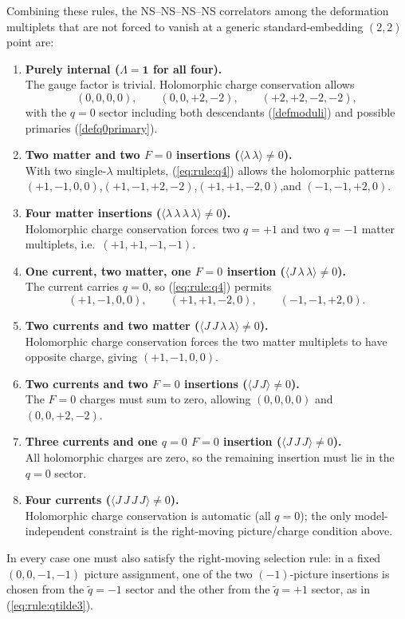 \documentclass[12pt]{article}
\newcommand{\wt}[1]{\widetilde{#1}}
\begin{document}
	Combining these rules, the NS--NS--NS--NS correlators among the deformation multiplets that are not forced to vanish at a generic standard-embedding $(2,2)$ point are:
	\begin{enumerate}
	\item {\bf Purely internal ($\Lambda=\mathbf{1}$ for all four).}\\
	The gauge factor is trivial. Holomorphic charge conservation allows
	\[
	(0,0,0,0),\qquad (0,0,+2,-2),\qquad (+2,+2,-2,-2),
	\]
	with the $q=0$ sector including both descendants (\ref{defmoduli}) and possible primaries (\ref{defq0primary}).
	
	\item {\bf Two matter and two $F=0$ insertions ($\langle\lambda\,\lambda\rangle\neq 0$).}\\
	With two single-$\lambda$ multiplets, (\ref{eq:rule:q4}) allows the holomorphic patterns $(+1,-1,0,0)$,\allowbreak $(+1,-1,+2,-2)$,\allowbreak $(+1,+1,-2,0)$,\allowbreak and $(-1,-1,+2,0)$.
	
	\item {\bf Four matter insertions ($\langle\lambda\,\lambda\,\lambda\,\lambda\rangle\neq 0$).}\\
	Holomorphic charge conservation forces two $q=+1$ and two $q=-1$ matter multiplets, i.e.\ $(+1,+1,-1,-1)$.
	
	\item {\bf One current, two matter, one $F=0$ insertion ($\langle J\,\lambda\,\lambda\rangle\neq 0$).}\\
	The current carries $q=0$, so (\ref{eq:rule:q4}) permits
	\[
	(+1,-1,0,0),\qquad (+1,+1,-2,0),\qquad (-1,-1,+2,0).
	\]
	
	\item {\bf Two currents and two matter ($\langle J\,J\,\lambda\,\lambda\rangle\neq 0$).}\\
	Holomorphic charge conservation forces the two matter multiplets to have opposite charge, giving $(+1,-1,0,0)$.
	
	\item {\bf Two currents and two $F=0$ insertions ($\langle J\,J\rangle\neq 0$).}\\
	The $F=0$ charges must sum to zero, allowing $(0,0,0,0)$ and $(0,0,+2,-2)$.
	
	\item {\bf Three currents and one $q=0$ $F=0$ insertion ($\langle J\,J\,J\rangle\neq 0$).}\\
	All holomorphic charges are zero, so the remaining insertion must lie in the $q=0$ sector.
	
	\item {\bf Four currents ($\langle J\,J\,J\,J\rangle\neq 0$).}\\
	Holomorphic charge conservation is automatic (all $q=0$); the only model-independent constraint is the right-moving picture/charge condition above.
	\end{enumerate}
	In every case one must also satisfy the right-moving selection rule: in a fixed $(0,0,-1,-1)$ picture assignment, one of the two $(-1)$-picture insertions is chosen from the $\wt q=-1$ sector and the other from the $\wt q=+1$ sector, as in (\ref{eq:rule:qtilde3}).
	
\end{document}
